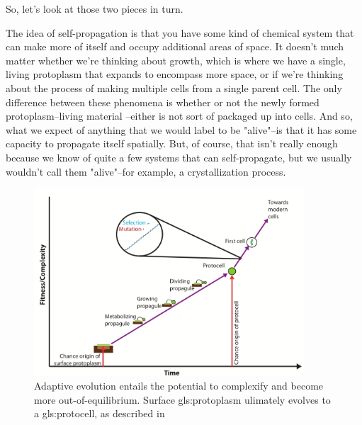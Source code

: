 \documentclass[]{article}
\begin{document}
So, let's look at those two pieces in turn.


The idea of self-propagation is that you have some kind of chemical system that can make more of itself and occupy additional areas of space. It doesn't much matter whether we're thinking about growth, which is where we have a single, living protoplasm that expands to encompass more space, or if we're thinking about the process of making multiple cells from a single parent cell.
The only difference between these phenomena is whether or not the newly formed protoplasm--living material --either is not sort of packaged up into cells.
And so, what we expect of anything that we would label to be "alive"--is that it has some capacity to propagate itself spatially.
But, of course, that isn't really enough because we know of quite a few systems that can self-propagate,
but we usually wouldn't call them "alive"--for example, a crystallization process.
\begin{figure}[H]
	\caption[Adaptive Evolution]{Adaptive evolution entails the potential to complexify and become more out-of-equilibrium. Surface \gls{gls:protoplasm} ulimately evolves to a \gls{gls:protocell}, as described in \cite{baum2015selection}}\label{fig:AdaptiveEvolution} 
	\includegraphics[width=0.9\textwidth]{AdaptiveEvolution}
\end{figure}
\end{document}
